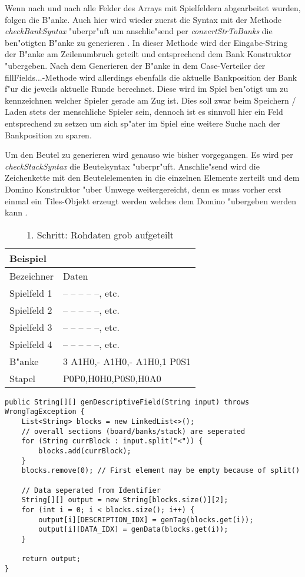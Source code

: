 Wenn nach und nach alle Felder des Arrays mit Spielfeldern abgearbeitet wurden, folgen die B"anke. Auch hier wird wieder zuerst die Syntax mit der Methode \emph{checkBankSyntax} "uberpr"uft um anschlie"send per \emph{convertStrToBanks} die ben"otigten B"anke zu generieren . In dieser Methode wird der Eingabe-String der B"anke am Zeilenumbruch geteilt und entsprechend dem Bank Konstruktor "ubergeben. Nach dem Generieren der B"anke in dem Case-Verteiler der fillFields...-Methode wird allerdings ebenfalls die aktuelle Bankposition der Bank f"ur die jeweils aktuelle Runde berechnet. Diese wird im Spiel ben"otigt um zu kennzeichnen welcher Spieler gerade am Zug ist. Dies soll zwar beim Speichern / Laden stets der menschliche Spieler sein, dennoch ist es sinnvoll hier ein Feld entsprechend zu setzen um sich sp"ater im Spiel eine weitere Suche nach der Bankposition zu sparen. 

Um den Beutel zu generieren wird genauso wie bisher vorgegangen. Es wird per \emph{checkStackSyntax} die Beutelsyntax "uberpr"uft. Anschlie"send wird die Zeichenkette mit den Beutelelementen in die einzelnen Elemente zerteilt und dem Domino Konstruktor "uber Umwege weitergereicht, denn es muss vorher erst einmal ein Tiles-Objekt erzeugt werden welches dem Domino "ubergeben werden kann . 

\begin{table}
\centering
\begin{tabular}{ll}
\toprule
Beispiel\\
\midrule
Bezeichner & Daten\\
\midrule
Spielfeld 1 & -- -- -- -- --, etc.\\
Spielfeld 2 & -- -- -- -- --, etc.\\
Spielfeld 3 & -- -- -- -- --, etc.\\
Spielfeld 4 & -- -- -- -- --, etc.\\
B"anke & 3 A1H0,- A1H0,- A1H0,1 P0S1\\
Stapel & P0P0,H0H0,P0S0,H0A0\\
\bottomrule
\end{tabular}
\caption{1. Schritt: Rohdaten grob aufgeteilt}
\label{tab:bspRochdaten}
\end{table}
 
\begin{lstlisting}[style=CodeHighlighting,float,caption=Converter - genDescriptiveField,label=lst:converter_genDescriptiveField]
public String[][] genDescriptiveField(String input) throws WrongTagException {
    List<String> blocks = new LinkedList<>();
    // overall sections (board/banks/stack) are seperated
    for (String currBlock : input.split("<")) {
        blocks.add(currBlock);
    }
    blocks.remove(0); // First element may be empty because of split()

    // Data seperated from Identifier
    String[][] output = new String[blocks.size()][2];
    for (int i = 0; i < blocks.size(); i++) {
        output[i][DESCRIPTION_IDX] = genTag(blocks.get(i));
        output[i][DATA_IDX] = genData(blocks.get(i));
    }

    return output;
}
\end{lstlisting}

